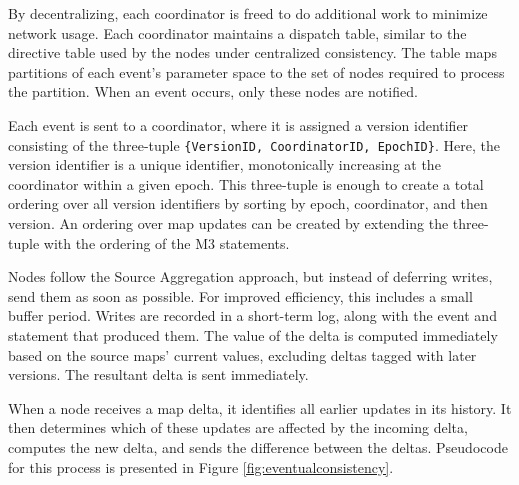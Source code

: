 \documentclass{vldb}
\begin{document}
By decentralizing, each coordinator is freed to do additional work to minimize network usage.  Each coordinator maintains a dispatch table, similar to the directive table used by the nodes under centralized consistency.  The table maps  partitions of each event's parameter space to the set of nodes required to process the partition.  When an event occurs, only these nodes are notified.

Each event is sent to a coordinator, where it is assigned a version identifier consisting of the three-tuple \texttt{\{VersionID, CoordinatorID, EpochID\}}.  Here, the version identifier is a unique identifier, monotonically increasing at the coordinator within a given epoch.  This three-tuple is enough to create a total ordering over all version identifiers by sorting by epoch, coordinator, and then version.  An ordering over map updates can be created by extending the three-tuple with the ordering of the M3 statements.  

Nodes follow the Source Aggregation approach, but instead of deferring writes, send them as soon as possible.  For improved efficiency, this includes a small buffer period.  Writes are recorded in a short-term log, along with the event and statement that produced them.  The value of the delta is computed immediately based on the source maps' current values, excluding deltas tagged with later versions.  The resultant delta is sent immediately.  

When a node receives a map delta, it identifies all earlier updates in its history.  It then determines which of these updates are affected by the incoming delta, computes the new delta, and sends the difference between the deltas.  Pseudocode for this process is presented in Figure \ref{fig:eventualconsistency}.
\end{document}

